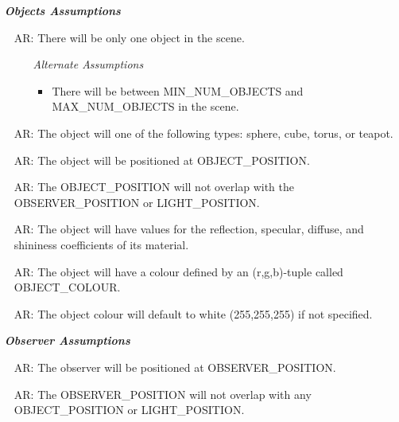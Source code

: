 \documentclass[12pt]{article}
\newcounter{assumpnum} %
\newcounter{assumpnumR} %
\begin{document}
~\newline
\textbf{\emph{Objects Assumptions}}
\begin{itemize}
	\item[AR\refstepcounter{assumpnumR}\theassumpnumR\label{as-obj-num}:]
	There will be only one object in the scene.
	\begin{itemize}
		\item[] \textit{Alternate Assumptions}
		\begin{itemize}
			\item There will be between MIN\_NUM\_OBJECTS and MAX\_NUM\_OBJECTS 
			in the scene.
		\end{itemize}
	\end{itemize}		
	\item[AR\refstepcounter{assumpnumR}\theassumpnumR\label{as-obj-type}:]
	The object will one of the following types: sphere, cube, torus, or teapot.
	\item[AR\refstepcounter{assumpnumR}\theassumpnumR\label{as-obj-init-pos}:]
	The object will be positioned at OBJECT\_POSITION.
	\item[AR\refstepcounter{assumpnumR}\theassumpnumR\label{as-obj-overlap}:]
	The OBJECT\_POSITION will not overlap with the OBSERVER\_POSITION  or 
	LIGHT\_POSITION.		
	\item[AR\refstepcounter{assumpnumR}\theassumpnumR\label{as-obj-properties}:]
	The object will have values for the reflection, specular, diffuse, and 
	shininess coefficients of its material.
	\item[AR\refstepcounter{assumpnumR}\theassumpnumR\label{as-obj-colour}:]
	The object will have a colour defined by an (r,g,b)-tuple called 
	OBJECT\_COLOUR.
	\item[AR\refstepcounter{assumpnumR}\theassumpnumR\label{as-obj-default-colour}:]
	The object colour will default to white (255,255,255) if not specified.	
\end{itemize}

~\newline
\textbf{\emph{Observer Assumptions}}
\begin{itemize}
	\item[AR\refstepcounter{assumpnumR}\theassumpnumR\label{as-obsv-pos}:]
	The observer will be positioned at OBSERVER\_POSITION.
	\item[AR\refstepcounter{assumpnumR}\theassumpnumR\label{as-obsv-overlap}:]
	The OBSERVER\_POSITION will not overlap with any OBJECT\_POSITION or 
	LIGHT\_POSITION.
\end{itemize}
\end{document}
